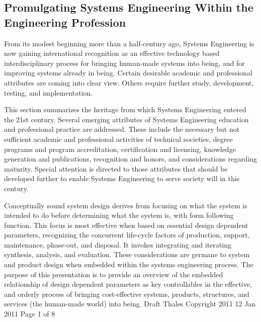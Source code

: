 \subsection{Promulgating Systems Engineering Within the Engineering Profession}

From its modest beginning more than a half-century ago, Systems Engineering is now gaining international recognition as an effective technology based interdisciplinary process for bringing human-made systems into being, and for improving systems already in being. Certain desirable academic and professional attributes are coming into clear view. Others require further study, development, testing, and implementation.

This section summarizes the heritage from which Systems Engineering entered the 21st century. Several emerging attributes of Systems Engineering education and professional practice are addressed. These include the necessary but not sufficient academic and professional activities of technical societies, degree programs and program accreditation, certification and licensing, knowledge generation and publications, recognition and honors, and considerations regarding maturity. Special attention is directed to those attributes that should be developed further to enable Systems Engineering to serve society will in this century.

Conceptually sound system design derives from focusing on what the system is intended to do before determining what the system is, with form following function. This focus is most effective when based on essential design dependent parameters, recognizing the concurrent life-cycle factors of production, support, maintenance, phase-out, and disposal. It invokes integrating and iterating synthesis, analysis, and evaluation. These considerations are germane to system and product design when embedded within the systems engineering process. The purpose of this presentation is to provide an overview of the embedded relationship of design dependent parameters as key controllables in the effective, and orderly process of bringing cost-effective systems, products, structures, and services (the human-made world) into being.  Draft Thales Copyright 2011 12 Jan 2011 Page 1 of 8